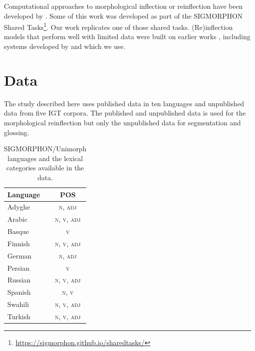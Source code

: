 Computational approaches to morphological inflection or reinflection have been developed by \citet{durrett_supervised_2013,nicolai_inflection_2015,cotterell_conll-sigmorphon_2017,kann_single-model_2016,aharoni_morphological_2017}. Some of this work was developed as part of the SIGMORPHON Shared Tasks\footnote{\url{https://sigmorphon.github.io/sharedtasks/}}. Our work replicates one of those shared tasks. (Re)inflection models that perform well with limited data were built on earlier works \cite{kann_one-shot_2017,sharma_iitbhuiiith_2018,makarov_uzh_2018,kann_learning_2020}, including systems developed by \citet{wu_exact_2019} and \citet{wu_applying_2020} which we use.

\section{Data}
\label{sec:data}

The study described here uses published data in ten languages and unpublished data from five IGT corpora. The published and unpublished data is used for the morphological reinflection but only the unpublished data for segmentation and glossing.  


\begin{table}[tb]
    \centering
    \begin{tabular}{lc}
        \textbf{Language} & \textbf{POS} \\
        \hline
        Adyghe  & \textsc{n}, \textsc{adj} \\
        Arabic & \textsc{n}, \textsc{v}, \textsc{adj} \\
        Basque & \textsc{v} \\
        Finnish & \textsc{n}, \textsc{v}, \textsc{adj} \\
        German & \textsc{n}, \textsc{adj} \\
        Persian & \textsc{v} \\
        Russian & \textsc{n}, \textsc{v}, \textsc{adj} \\
        Spanish & \textsc{n}, \textsc{v} \\
        Swahili & \textsc{n}, \textsc{v}, \textsc{adj} \\
        Turkish & \textsc{n}, \textsc{v}, \textsc{adj} \\
    \end{tabular}
    \caption{SIGMORPHON/Unimorph languages and the lexical categories available in the data.}
    \label{tab:SIGPOSdata}
\end{table}


